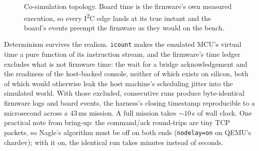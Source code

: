 \documentclass[11pt]{article}
\newcommand{\iic}{I\textsuperscript{2}C}
\begin{document}
\begin{figure}[htbp]
\centering
{}
\caption{Co-simulation topology.  Board time is the firmware's own
measured execution, so every \iic{} edge lands at its true instant
and the board's events preempt the firmware as they would on the
bench.}
\label{fig:cosim}
\end{figure}

Determinism survives the realism.  \texttt{icount} makes the
emulated MCU's virtual time a pure function of its instruction
stream, and the firmware's time ledger excludes what is not
firmware time: the wait for a bridge acknowledgement and the
readiness of the host-backed console, neither of which exists on
silicon, both of which would otherwise leak the host machine's
scheduling jitter into the simulated world.  With those excluded,
consecutive runs produce byte-identical firmware logs and board
events, the harness's closing timestamp reproducible to a
microsecond across a 43\,ms mission.  A full mission takes
${\sim}10$\,s of wall clock.  One practical note from bring-up: the
command/ack round-trips are tiny TCP packets, so Nagle's algorithm
must be off on both ends (\texttt{nodelay=on} on QEMU's chardev);
with it on, the identical run takes minutes instead of seconds.
\end{document}
